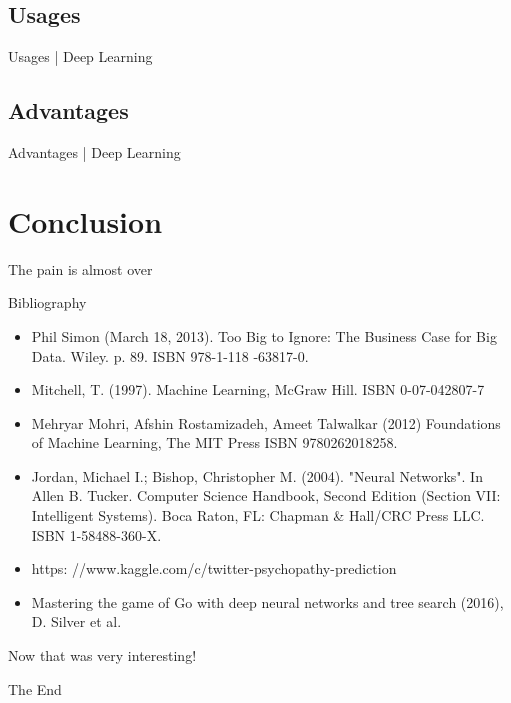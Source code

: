 \documentclass[10pt]{beamer}
\begin{document}
		\subsection{Usages}
			\begin{frame}{Usages | Deep Learning}
			\end{frame}
		\subsection{Advantages}
			\begin{frame}{Advantages | Deep Learning}
			\end{frame}
	
	
	
	\section{Conclusion}
		\begin{frame}{The pain is almost over}
		\end{frame}
		\begin{frame}{Bibliography}
			\twocolumn
			\begin{itemize}
				\item \scriptsize{Phil Simon (March 18, 2013). Too Big to Ignore: The Business Case for Big Data. Wiley. p. 89. ISBN 978-1-118
					-63817-0.}
				\item \scriptsize{Mitchell, T. (1997). Machine Learning, McGraw Hill. ISBN 0-07-042807-7}
				\item \scriptsize{ Mehryar Mohri, Afshin Rostamizadeh, Ameet Talwalkar (2012) Foundations of Machine Learning, The MIT Press ISBN 9780262018258.}
				\item \scriptsize{Jordan, Michael I.; Bishop, Christopher M. (2004). "Neural Networks". In Allen B. Tucker. Computer Science Handbook, Second Edition (Section VII: Intelligent Systems). Boca Raton, FL: Chapman \& Hall/CRC Press LLC. ISBN 1-58488-360-X.}
				\item \scriptsize{https: //www.kaggle.com/c/twitter-psychopathy-prediction}
				\item \scriptsize{Mastering the game of Go with deep neural networks and tree search (2016), D. Silver et al.}
			\end{itemize}
			\onecolumn
		\end{frame}
\endgroup

\begingroup
	\begin{frame}[plain,c]
		\hspace*{6 mm}
		\vspace*{-18 mm}
		\textcolor{blue_light}{\Large{Now that was very interesting!}}
	\end{frame}
	\begin{frame}[plain,c]
		\hspace*{27 mm}
		\vspace*{-20 mm}
		\textcolor{blue_light}{\Large{The End}}
	\end{frame}
\endgroup
\end{document}
